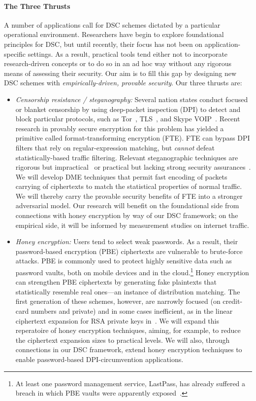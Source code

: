 \documentclass[10pt]{article}
\begin{document}
\paragraph{The Three Thrusts} A number of applications call for DSC schemes dictated by a particular operational environment. Researchers have begin to explore foundational principles for DSC, but until recently, their focus has not been on application-specific settings. As a result, practical tools tend either not to incorporate research-driven concepts or to do so in an ad hoc way without any rigorous means of assessing their security. Our aim is to fill this gap by designing new DSC schemes with {\em empirically-driven, provable security}. Our three thrusts are:

\begin{itemize}
\item{\em Censorship resistance / steganography:} Several nation states conduct focused or blanket censorship by using deep-packet inspection (DPI) to detect and block particular protocols, such as 
Tor~\cite{Tor:iran_block-2011,Tor:iran_block,Tor:china_block_one,Tor:china_block,
Tor:china_active_probe,Winter2012,Clayton06ignoringthe}, TLS~\cite{TLS:iran_block}, and 
Skype VOIP~\cite{China_skype_ban,UAE_skype_ban}. Recent research in provably secure encryption for this problem has yielded a primitive called format-transforming encryption (FTE). FTE can bypass DPI filters that rely on regular-expression matching, but  {\em cannot} defeat statistically-based traffic filtering. Relevant steganographic techniques are rigorous but impractical~\cite{Stegotoros} or practical but lacking strong security assurances~\cite{Hopper}. We will develop DME techniques that permit fast encoding  of packets carrying of ciphertexts to match the statistical properties of normal traffic. We will thereby carry the provable security benefits of FTE into a stronger adversarial model. Our research will benefit on the foundational side from connections with honey encryption by way of our DSC framework; on the empirical side, it will be informed by measurement studies on internet traffic.
\item{\em Honey encryption:} Users tend to select weak passwords. As a result, their password-based encryption (PBE) ciphertexts are vulnerable to brute-force attacks. PBE is commonly used to protect highly sensitive data such as password vaults, both on mobile devices and in the cloud.\footnote{At least one password management service, LastPass, has already suffered a breach in which PBE vaults were apparently exposed~\cite{}.} Honey encryption can strengthen PBE ciphertexts by generating fake plaintexts that statistically resemble real ones---an instance of distribution matching. The first generation of these schemes, however, are narrowly focused (on credit-card numbers and private) and in some cases inefficient, as in the linear ciphertext expansion for RSA private keys in~\cite{}. We will expand this reperatoire of honey encryption techniques, aiming, for example, to reduce the ciphertext expansion sizes to practical levels. We will also, through connections in our DSC framework, extend honey encryption techniques to enable password-based DPI-circumvention applications.

\end{itemize}
\end{document}
